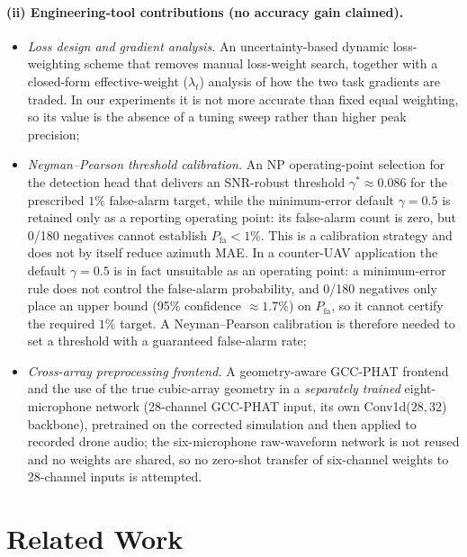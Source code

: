 \documentclass[5p,twocolumn]{elsarticle}
\begin{document}
\paragraph{(ii) Engineering-tool contributions (no accuracy gain claimed).}
\begin{itemize}
    \item \emph{Loss design and gradient analysis.} An uncertainty-based dynamic loss-weighting scheme that removes manual loss-weight search, together with a closed-form effective-weight ($\lambda_t$) analysis of how the two task gradients are traded. In our experiments it is not more accurate than fixed equal weighting, so its value is the absence of a tuning sweep rather than higher peak precision;
    \item \emph{Neyman--Pearson threshold calibration.} An NP operating-point selection for the detection head that delivers an SNR-robust threshold $\gamma^*\approx0.086$ for the prescribed $1\%$ false-alarm target, while the minimum-error default $\gamma=0.5$ is retained only as a reporting operating point: its false-alarm count is zero, but 0/180 negatives cannot establish $P_{\mathrm{fa}}<1\%$. This is a calibration strategy and does not by itself reduce azimuth MAE. In a counter-UAV application the default $\gamma=0.5$ is in fact unsuitable as an operating point: a minimum-error rule does not control the false-alarm probability, and 0/180 negatives only place an upper bound (95\% confidence $\approx1.7\%$) on $P_{\mathrm{fa}}$, so it cannot certify the required $1\%$ target. A Neyman--Pearson calibration is therefore needed to set a threshold with a guaranteed false-alarm rate;
    \item \emph{Cross-array preprocessing frontend.} A geometry-aware GCC-PHAT frontend and the use of the true cubic-array geometry in a \emph{separately trained} eight-microphone network (28-channel GCC-PHAT input, its own Conv1d($28,32$) backbone), pretrained on the corrected simulation and then applied to recorded drone audio; the six-microphone raw-waveform network is not reused and no weights are shared, so no zero-shot transfer of six-channel weights to 28-channel inputs is attempted.
\end{itemize}

\section{Related Work}
\label{sec:related}
\end{document}
